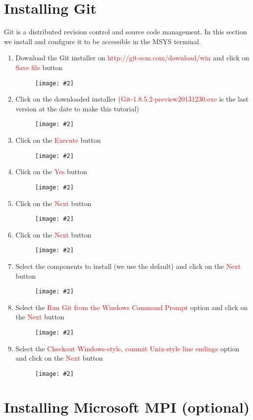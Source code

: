 \documentclass[a4paper]{article}
\newcommand{\FIG}[2]
{
	\begin{figure}[ht!]
	\centering
	\texttt{[image: \#2]}
	\end{figure}
}
\newcommand{\FIGURE}[1]{\FIG{0.35}{#1}}
\newcommand{\RED}[1] {\textcolor{red}{#1}}
\begin{document}
\clearpage

\section{Installing Git}

Git is a distributed revision control and source code management. In this
section we install and configure it to be accessible in the MSYS terminal.

\begin{enumerate}

\item Download the Git installer on \RED{http://git-scm.com/download/win} and
click on \RED{Save file} button
\FIGURE{git-1.png.eps}

\clearpage

\item Click on the downloaded installer (\RED{Git-1.8.5.2-preview20131230.exe}
is the last version at the date to make this tutorial)
\FIGURE{git-2.png.eps}

\item Click on the \RED{Execute} button
\FIGURE{git-3.png.eps}

\clearpage

\item Click on the \RED{Yes} button
\FIGURE{git-4.png.eps}

\item Click on the \RED{Next} button
\FIGURE{git-5.png.eps}

\clearpage

\item Click on the \RED{Next} button
\FIGURE{git-6.png.eps}

\item Select the components to install (we use the default) and click on the
\RED{Next} button
\FIGURE{git-7.png.eps}

\clearpage

\item Select the \RED{Run Git from the Windows Command Prompt} option and click
on the \RED{Next} button
\FIGURE{git-8.png.eps}

\item Select the \RED{Checkout Windows-style, commit Unix-style line endings}
option and click on the \RED{Next} button
\FIGURE{git-9.png.eps}

\clearpage

\end{enumerate}

\section{Installing Microsoft MPI (optional)}
\end{document}
